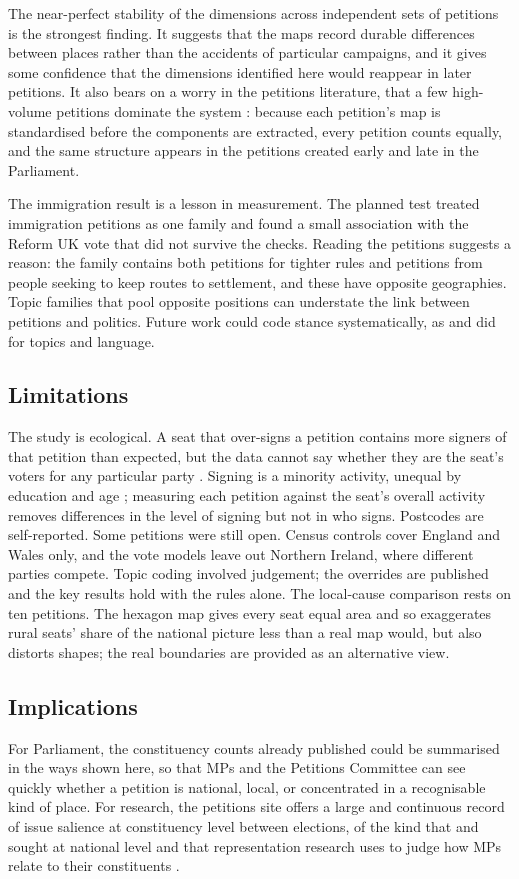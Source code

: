 \documentclass[11pt,a4paper]{article}
\begin{document}
The near-perfect stability of the dimensions across independent sets of petitions is the strongest finding. It suggests that the maps record durable differences between places rather than the accidents of particular campaigns, and it gives some confidence that the dimensions identified here would reappear in later petitions. It also bears on a worry in the petitions literature, that a few high-volume petitions dominate the system \citep{jungherr2010}: because each petition's map is standardised before the components are extracted, every petition counts equally, and the same structure appears in the petitions created early and late in the Parliament.

The immigration result is a lesson in measurement. The planned test treated immigration petitions as one family and found a small association with the Reform UK vote that did not survive the checks. Reading the petitions suggests a reason: the family contains both petitions for tighter rules and petitions from people seeking to keep routes to settlement, and these have opposite geographies. Topic families that pool opposite positions can understate the link between petitions and politics. Future work could code stance systematically, as \citet{vidgen2020} and \citet{hagen2016} did for topics and language.

\subsection{Limitations}
The study is ecological. A seat that over-signs a petition contains more signers of that petition than expected, but the data cannot say whether they are the seat's voters for any particular party \citep{robinson1950}. Signing is a minority activity, unequal by education and age \citep{schlozman2010,escher2017}; measuring each petition against the seat's overall activity removes differences in the level of signing but not in who signs. Postcodes are self-reported. Some petitions were still open. Census controls cover England and Wales only, and the vote models leave out Northern Ireland, where different parties compete. Topic coding involved judgement; the overrides are published and the key results hold with the rules alone. The local-cause comparison rests on ten petitions. The hexagon map gives every seat equal area and so exaggerates rural seats' share of the national picture less than a real map would, but also distorts shapes; the real boundaries are provided as an alternative view.

\subsection{Implications}
For Parliament, the constituency counts already published could be summarised in the ways shown here, so that MPs and the Petitions Committee can see quickly whether a petition is national, local, or concentrated in a recognisable kind of place. For research, the petitions site offers a large and continuous record of issue salience at constituency level between elections, of the kind that \citet{jonesbaumgartner2005} and \citet{sorokawlezien2010} sought at national level and that representation research uses to judge how MPs relate to their constituents \citep{hanretty2017}.
\end{document}
